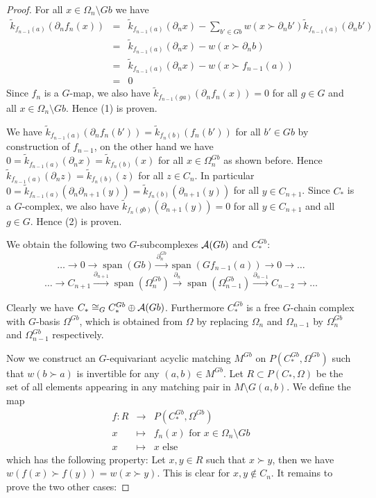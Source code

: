 \documentclass{elsarticle}
\def\span{\operatorname{span}}
\begin{document}
\begin{proof}
For all $x\in\Omega_n\setminus Gb$ we have
\begin{eqnarray*}
\widetilde k_{f_{n-1}(a)}(\partial_n f_n(x))&=&\widetilde k_{f_{n-1}(a)}(\partial_n x)-\sum_{b'\in Gb}w(x\succ\partial_n b')\widetilde k_{f_{n-1}(a)}(\partial_n b')\\
&=&\widetilde k_{f_{n-1}(a)}(\partial_n x)-w(x\succ\partial_n b)\\
&=&\widetilde k_{f_{n-1}(a)}(\partial_n x)-w(x\succ f_{n-1}(a))\\
&=&0
\end{eqnarray*}
Since $f_n$ is a $G$-map, we also have $\widetilde k_{f_{n-1}(ga)}(\partial_n f_n(x))=0$ for all $g\in G$ and all $x\in\Omega_n\setminus Gb$. Hence (1) is proven.

We have $\widetilde k_{f_{n-1}(a)}(\partial_n f_n(b'))=\widetilde k_{f_n(b)}(f_n(b'))$ for all $b'\in Gb$ by construction of $f_{n-1}$, on the other hand we have $0=\widetilde k_{f_{n-1}(a)}(\partial_n x)=\widetilde k_{f_n(b)}(x)$ for all $x\in\Omega_n^{Gb}$ as shown before. Hence $\widetilde k_{f_{n-1}(a)}(\partial_n z)=\widetilde k_{f_n(b)}(z)$ for all $z\in C_n$. In particular $0=\widetilde k_{f_{n-1}(a)}(\partial_n\partial_{n+1}(y))=\widetilde k_{f_n(b)}(\partial_{n+1}(y))$ for all $y\in C_{n+1}$. Since $C_*$ is a $G$-complex, we also have $\widetilde k_{f_n(gb)}(\partial_{n+1}(y))=0$ for all $y\in C_{n+1}$ and all $g\in G$. Hence (2) is proven.

We obtain the following two $G$-subcomplexes ${\cal A}(Gb)$ and $C_*^{Gb}$:
\[\dots\longrightarrow 0\longrightarrow\span(Gb)\overset{\partial_n^{Gb}}\longrightarrow\span(Gf_{n-1}(a))\longrightarrow 0\longrightarrow\dots\]
\[\dots\longrightarrow C_{n+1}\overset{\partial_{n+1}}\longrightarrow\span(\Omega_n^{Gb})\overset{\partial_n}\longrightarrow\span(\Omega_{n-1}^{Gb})\overset{\partial_{n-1}}\longrightarrow C_{n-2}\longrightarrow\dots\]

Clearly we have $C_*\cong_G C_*^{Gb}\oplus{\cal A}(Gb)$. Furthermore $C_*^{Gb}$ is a free $G$-chain complex with $G$-basis $\Omega^{Gb}$, which is obtained from $\Omega$ by replacing $\Omega_n$ and $\Omega_{n-1}$ by $\Omega_n^{Gb}$ and $\Omega_{n-1}^{Gb}$ respectively.

Now we construct an $G$-equivariant acyclic matching $M^{Gb}$ on $P(C_*^{Gb},\Omega^{Gb})$ such that $w(b\succ a)$ is invertible for any $(a,b)\in M^{Gb}$. Let $R\subset P(C_*,\Omega)$ be the set of all elements appearing in any matching pair in $M\setminus G(a,b)$. We define the map
\begin{eqnarray*}
f:R&\longrightarrow&P(C_*^{Gb},\Omega^{Gb})\\
x&\longmapsto&f_n(x)\text{ for $x\in\Omega_n\setminus Gb$}\\
x&\longmapsto&x\text{ else}
\end{eqnarray*}
which has the following property: Let $x,y\in R$ such that $x\succ y$, then we have $w(f(x)\succ f(y))=w(x\succ y)$. This is clear for $x,y\not\in C_n$. It remains to prove the two other cases:


\end{proof}
\end{document}
